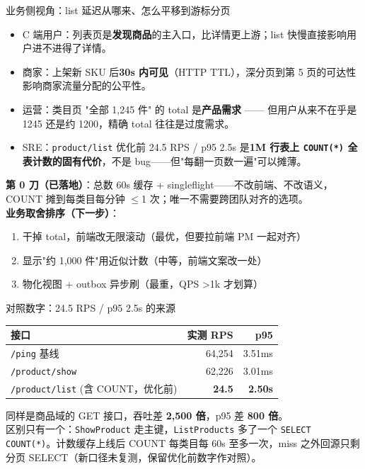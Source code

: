 \documentclass[aspectratio=169,11pt]{beamer}
\begin{document}
\begin{frame}[shrink]{业务侧视角：list 延迟从哪来、怎么平移到游标分页}
\begin{itemize}
  \item C 端用户：列表页是\textbf{发现商品}的主入口，比详情更上游；list 快慢直接影响用户进不进得了详情。
  \item 商家：上架新 SKU 后\textbf{30s 内可见}（HTTP TTL），深分页到第 5 页的可达性影响商家流量分配的公平性。
  \item 运营：类目页 "全部 1{,}245 件" 的 total 是\textbf{产品需求} —— 但用户从来不在乎是 1245 还是约 1200，精确 total 往往是过度需求。
  \item SRE：\texttt{product/list} 优化前 24.5 RPS / p95 2.5s 是\textbf{1M 行表上 \texttt{COUNT(*)} 全表计数的固有代价}，不是 bug——但"每翻一页数一遍"可以摊薄。
\end{itemize}
\vspace{1mm}
\textbf{第 0 刀（已落地）}：总数 60s 缓存 + singleflight——不改前端、不改语义，COUNT 摊到每类目每分钟 $\le$1 次；唯一不需要跨团队对齐的选项。\\
\textbf{业务取舍排序（下一步）}：
\begin{enumerate}
  \item 干掉 total，前端改无限滚动（最优，但要拉前端 PM 一起对齐）
  \item 显示"约 1{,}000 件"用近似计数（中等，前端文案改一处）
  \item 物化视图 + outbox 异步刷（最重，QPS \textgreater 1k 才划算）
\end{enumerate}
\end{frame}

\begin{frame}[shrink]{对照数字：24.5 RPS / p95 2.5s 的来源}
\begin{tabular}{@{}lrr@{}}
\toprule
接口 & 实测 RPS & p95 \\
\midrule
\texttt{/ping} 基线          & 64{,}254 & 3.51ms \\
\texttt{/product/show}      & 62{,}226 & 3.01ms \\
\texttt{/product/list} (含 COUNT，优化前) & \textbf{24.5}    & \textbf{2.50s} \\
\bottomrule
\end{tabular}
\vspace{2mm}
\small 同样是商品域的 GET 接口，吞吐差 \textbf{2{,}500 倍}，p95 差 \textbf{800 倍}。\\
区别只有一个：\texttt{ShowProduct} 走主键，\texttt{ListProducts} 多了一个 \texttt{SELECT COUNT(*)}。计数缓存上线后 COUNT 每类目每 60s 至多一次，miss 之外回源只剩分页 SELECT（新口径未复测，保留优化前数字作对照）。
\end{frame}
\end{document}
